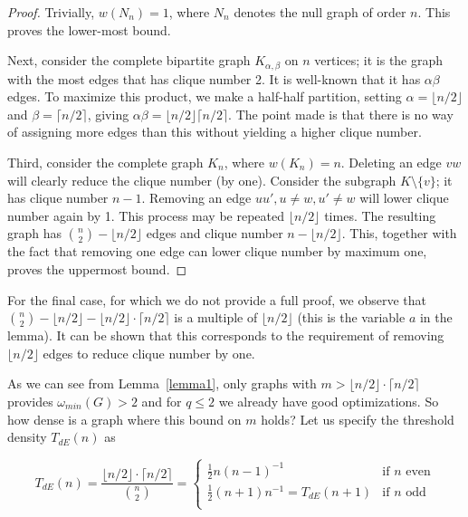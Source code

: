 \documentclass{cslthse-msc}
\newcommand{\density}{dE}
\begin{document}

\begin{proof}
 Trivially, $w(N_n) = 1$, where $N_n$ denotes the null graph of order $n$. This proves the lower-most bound.
 
 Next, consider the complete bipartite graph $K_{\alpha,\beta}$ on $n$ vertices; it is the graph with the most edges that has clique number 2. It is well-known that it has $\alpha \beta$ edges. To maximize this product, we make a half-half partition, setting $\alpha = \lfloor n / 2 \rfloor$ and $\beta = \lceil n / 2 \rceil$, giving $\alpha \beta = \lfloor n / 2 \rfloor \lceil n / 2 \rceil$. The point made is that there is no way of assigning more edges than this without yielding a higher clique number.
 
 Third, consider the complete graph $K_n$, where $w(K_n) = n$. Deleting an edge $vw$ will clearly reduce the clique number (by one). Consider the subgraph $K \setminus \{v\}$; it has clique number $n - 1$. Removing an edge $uu', u \neq w, u' \neq w$ will lower clique number again by 1. This process may be repeated $\lfloor n / 2 \rfloor$ times. The resulting graph has $\binom{n}{2} - \lfloor n/2 \rfloor$ edges and clique number $n - \lfloor n/2 \rfloor$. This, together with the fact that removing one edge can lower clique number by maximum one, proves the uppermost bound. 
\end{proof}
For the final case, for which we do not provide a full proof, we observe that $\binom{n}{2} - \lfloor n/2 \rfloor - \lfloor n / 2 \rfloor \cdot \lceil n / 2 \rceil$ is a multiple of $\lfloor n/2 \rfloor$ (this is the variable $a$ in the lemma). It can be shown that this corresponds to the requirement of removing $\lfloor n/2 \rfloor$ edges to reduce clique number by one.

As we can see from Lemma~\ref{lemma1}, only graphs with $m > \lfloor n / 2 \rfloor \cdot \lceil n / 2 \rceil$ provides $\omega_{min}(G) > 2$ and for $q \leq 2$ we already have good optimizations. So how dense is a graph where this bound on $m$ holds? Let us specify the threshold density $T_{\density{}}(n)$ as

\[
T_{\density{}}(n) = \frac{\lfloor n / 2 \rfloor \cdot \lceil n / 2 \rceil}{\binom{n}{2}} =
\begin{cases}
	  \frac{1}{2}n(n-1)^{-1} & \text{if } n \text{ even}\\
	  \frac{1}{2}(n+1)n^{-1} = T_{\density{}}(n+1) & \text{if } n \text{ odd}\\
\end{cases}
\]
\end{document}
